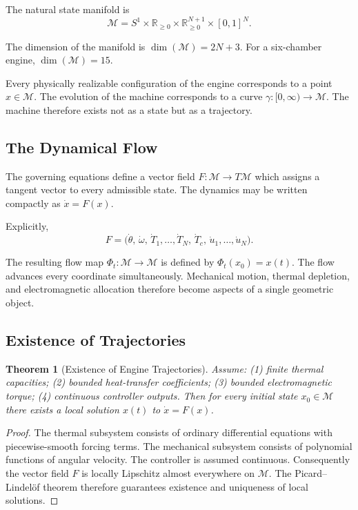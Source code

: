 \documentclass[12pt,a4paper]{article}
\newtheorem{theorem}{Theorem}[section]
\newcommand{\M}{\mathcal{M}}
\begin{document}
The natural state manifold is
\[
\M = S^1 \times \mathbb{R}_{\ge 0} \times \mathbb{R}_{\ge 0}^{N+1} \times [0,1]^N.
\]

The dimension of the manifold is $\dim(\M) = 2N + 3$. For a six-chamber engine, $\dim(\M) = 15$.

Every physically realizable configuration of the engine corresponds to a point $x \in \M$. The evolution of the machine corresponds to a curve $\gamma : [0,\infty) \to \M$. The machine therefore exists not as a state but as a trajectory.

\subsection{The Dynamical Flow}

The governing equations define a vector field $F : \M \to T\M$ which assigns a tangent vector to every admissible state. The dynamics may be written compactly as $\dot{x} = F(x)$.

Explicitly,
\[
F = \bigl(\dot\theta,\, \dot\omega,\, \dot T_1, \ldots, \dot T_N,\, \dot T_c,\, \dot u_1, \ldots, \dot u_N\bigr).
\]

The resulting flow map $\Phi_t : \M \to \M$ is defined by $\Phi_t(x_0) = x(t)$. The flow advances every coordinate simultaneously. Mechanical motion, thermal depletion, and electromagnetic allocation therefore become aspects of a single geometric object.

\subsection{Existence of Trajectories}

\begin{theorem}[Existence of Engine Trajectories]
Assume: (1) finite thermal capacities; (2) bounded heat-transfer coefficients; (3) bounded electromagnetic torque; (4) continuous controller outputs. Then for every initial state $x_0 \in \M$ there exists a local solution $x(t)$ to $\dot x = F(x)$.
\end{theorem}

\begin{proof}
The thermal subsystem consists of ordinary differential equations with piecewise-smooth forcing terms. The mechanical subsystem consists of polynomial functions of angular velocity. The controller is assumed continuous. Consequently the vector field $F$ is locally Lipschitz almost everywhere on $\M$. The Picard--Lindel\"{o}f theorem therefore guarantees existence and uniqueness of local solutions.
\end{proof}
\end{document}

